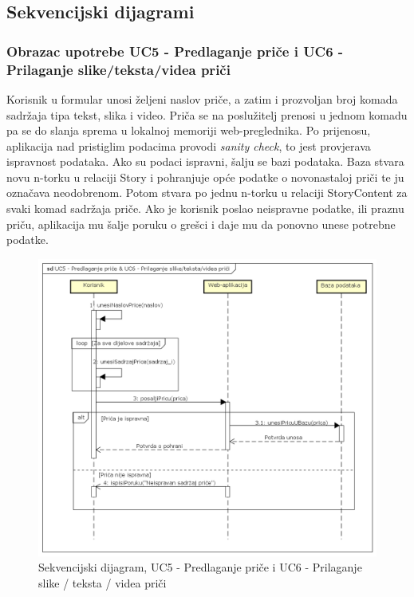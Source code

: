 				\eject		
				
			\subsection{Sekvencijski dijagrami}
				
				\subsubsection{Obrazac upotrebe UC5 - Predlaganje priče i UC6 - Prilaganje slike/teksta/videa priči}
					\noindent Korisnik u formular unosi željeni naslov priče, a zatim i prozvoljan broj komada sadržaja tipa tekst, slika i video. Priča se na poslužitelj prenosi u jednom komadu pa se do slanja sprema u lokalnoj memoriji web-preglednika. Po prijenosu, aplikacija nad pristiglim podacima provodi \textit{sanity check}, to jest provjerava ispravnost podataka. Ako su podaci ispravni, šalju se bazi podataka. Baza stvara novu n-torku u relaciji Story i pohranjuje opće podatke o novonastaloj priči te ju označava neodobrenom. Potom stvara po jednu n-torku u relaciji StoryContent za svaki komad sadržaja priče. Ako je korisnik poslao neispravne podatke, ili praznu priču, aplikacija mu šalje poruku o grešci i daje mu da ponovno unese potrebne podatke.
					\begin{figure}[H]
						\includegraphics[width=.9\linewidth]{dijagrami/SD_UC5&UC6.png}
						\centering
						\caption{Sekvencijski dijagram, UC5 - Predlaganje priče i UC6 - Prilaganje slike / teksta / videa priči}	
						\label{fig:sekvdija1}
					\end{figure}
				\eject
				
